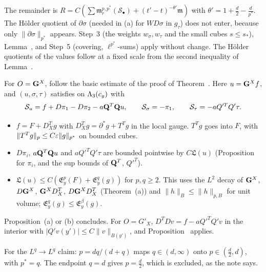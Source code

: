 \begin{detail}
\begin{itemize}
\end{itemize}
The remainder is $R=C(\sum\mathfrak m^{p,p^*}_r(\mathcal S_\bullet)+(t'-t)^{-\theta'}\mathfrak m)$ with $\theta'=1+\frac d2-\frac d{p^*}$. The H\"older quotient of $\partial\sigma$ (needed in (a) for $W D\sigma$ in $g_\tau$) does not enter, because only $\|\partial\sigma\|_{p^*}$ appears. Step~3 (the weights $w_\sigma,w_\tau$ and the small cubes $s\le s_*$), Lemma~, and Step~5 (covering, $\ell^{p^*}$-sums) apply without change. The H\"older quotients of the values follow at a fixed scale from the second inequality of Lemma~.
\end{detail}

\begin{detail}\label{d9:lp-cor}
For $O=\mathbf G^X$, follow the basic estimate of the proof of Theorem~. Here $u=\mathbf G^Xf$, and $(u,\sigma,\tau)$ satisfies  on $\Lambda_3(c_y)$ with
\[
\mathcal S_u=f+D\pi_1-D\pi_2-a\mathbf Q^T\mathbf Q u,\qquad\mathcal S_\sigma=-\pi_1,\qquad\mathcal S_\tau=-aQ'^TQ'\tau .
\]
\begin{itemize}
\item $f=F+D^T_Xg$ with $D^T_Xg=\partial^*g+T^Tg$ in the local gauge. $T^Tg$ goes into $F$, with $\|T^Tg\|_p\le C\varepsilon\|g\|_{p^*}$ on bounded cubes.
\item $D\pi_i$, $a\mathbf Q^T\mathbf Q u$ and $aQ'^TQ'\tau$ are bounded pointwise by $C\mathfrak L(u)$ (Proposition~ for $\pi_i$, and the sup bounds of $\mathbf Q^T$, $Q'^T$).
\item $\mathfrak L(u)\le C(\mathfrak E^p_y(F)+\mathfrak E^q_y(g))$ for $p,q\ge2$. This uses the $L^2$ decay of $\mathbf G^X$, $D\mathbf G^X$, $\mathbf G^XD^T_X$, $D\mathbf G^XD^T_X$ (Theorem~(a)) and $\|h\|_{B}\le\|h\|_{p,B}$ for unit volume; $\mathfrak E^q_y(g)\le\mathfrak E^\beta_y(g)$.
\end{itemize}
Proposition~(a) or (b) concludes. For $O=G'_X$, $D^TDv=f-aQ'^TQ'v$ in the interior with $|Q'v(y')|\le C\|v\|_{B(y')}$, and Proposition~ applies.

For the $L^q\to L^q$ claim: $p=dq/(d+q)$ maps $q\in(d,\infty)$ onto $p\in(\frac d2,d)$, with $p^*=q$. The endpoint $q=d$ gives $p=\frac d2$, which is excluded, as the note says.
\end{detail}

